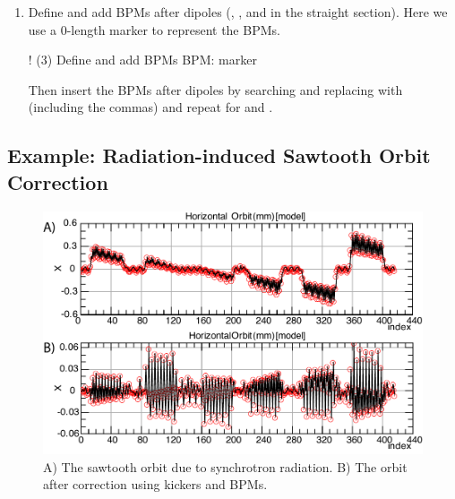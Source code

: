 \documentclass{hitec}     %
\begin{document}
{{{{\begin{enumerate}[leftmargin=*]
Because we have used D1 drifts repeatedly throughout the ring, adding correctors manually is a tedious task. The easiest approach is to use regular expressions in Find and Replace. The recipe is the following: 
\begin{code}
1. In the forward arcs for drifts after focusing quadrupoles:
    Replace (QF[^,\n]*,[^,\n]*)D1 with \1D1C1, CH, D1C2 for 
2. In the forward arcs for drifts after defocusing quadrupoles:
    Replace (QD[^,\n]*,[^,\n]*)D1 with \1D1C1, CV, D1C2
3. In the reverse arcs for drifts before focusing quadrupoles:
    Replace (D1)([^,\n]*,[^,\n]*QF), with D1C2, CH, D1C1. In the reverse arcs for drifts before defocusing quadrupoles:
    Replace (D1)([^,\n]*,[^,\n]*QD), with D1C2, CV, D1C1. In the reverse arcs for drifts at the end of a cell:
    Replace D1) with D1C2, CH, D1C1) 
\end{code}
In some text editors, you may need to use \$1 and \$2 instead of \textbackslash 1 and \textbackslash 2.
\item Define and add BPMs after dipoles (, , and  in the straight section). Here we use a 0-length marker to represent the BPMs.
\begin{code}
! (3) Define and add BPMs
BPM: marker
\end{code}
Then insert the BPMs after dipoles by searching and replacing  with  (including the commas) and repeat for  and .
\end{enumerate}

\subsection{Example: Radiation-induced Sawtooth Orbit Correction}
\label{s:sawtooth}

\begin{figure}[!h]
  \centering
  \includegraphics[width=0.9\linewidth]{figures/sawtooth.pdf}
  \caption{A) The sawtooth orbit due to synchrotron radiation. B) The orbit after correction using kickers and BPMs.}
  \label{f:sawtooth}
\end{figure}

}}}}
\end{document}
